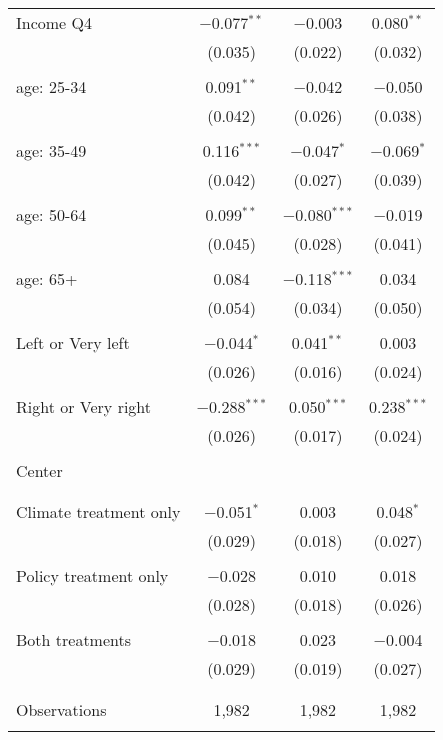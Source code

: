 \begin{tabular}{@{\extracolsep{5pt}}lccc}
 Income Q4 & $-$0.077$^{**}$ & $-$0.003 & 0.080$^{**}$ \\ 
  & (0.035) & (0.022) & (0.032) \\ 
  & & & \\ 
 age: 25-34 & 0.091$^{**}$ & $-$0.042 & $-$0.050 \\ 
  & (0.042) & (0.026) & (0.038) \\ 
  & & & \\ 
 age: 35-49 & 0.116$^{***}$ & $-$0.047$^{*}$ & $-$0.069$^{*}$ \\ 
  & (0.042) & (0.027) & (0.039) \\ 
  & & & \\ 
 age: 50-64 & 0.099$^{**}$ & $-$0.080$^{***}$ & $-$0.019 \\ 
  & (0.045) & (0.028) & (0.041) \\ 
  & & & \\ 
 age: 65+ & 0.084 & $-$0.118$^{***}$ & 0.034 \\ 
  & (0.054) & (0.034) & (0.050) \\ 
  & & & \\ 
 Left or Very left & $-$0.044$^{*}$ & 0.041$^{**}$ & 0.003 \\ 
  & (0.026) & (0.016) & (0.024) \\ 
  & & & \\ 
 Right or Very right & $-$0.288$^{***}$ & 0.050$^{***}$ & 0.238$^{***}$ \\ 
  & (0.026) & (0.017) & (0.024) \\ 
  & & & \\ 
 Center &  &  &  \\ 
  &  &  &  \\ 
  & & & \\ 
 Climate treatment only & $-$0.051$^{*}$ & 0.003 & 0.048$^{*}$ \\ 
  & (0.029) & (0.018) & (0.027) \\ 
  & & & \\ 
 Policy treatment only & $-$0.028 & 0.010 & 0.018 \\ 
  & (0.028) & (0.018) & (0.026) \\ 
  & & & \\ 
 Both treatments & $-$0.018 & 0.023 & $-$0.004 \\ 
  & (0.029) & (0.019) & (0.027) \\ 
  & & & \\ 
\hline \\[-1.8ex] 

Observations & 1,982 & 1,982 & 1,982 \\ 
\hline 
\hline \\[-1.8ex] 
\end{tabular} 
